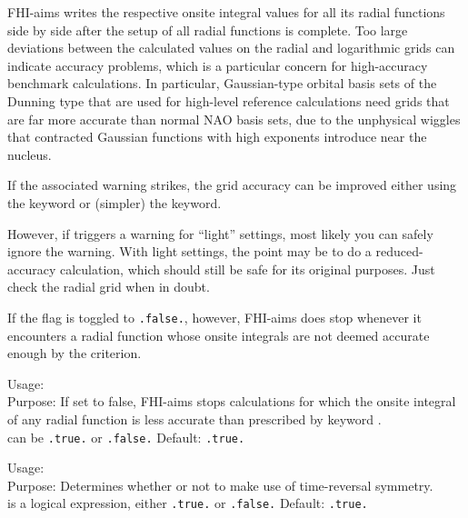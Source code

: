 FHI-aims writes the respective onsite integral values for all its
radial functions side by side after the setup of all radial functions
is complete. Too large deviations between the calculated values on the
radial and logarithmic grids can indicate accuracy problems, which is
a particular concern for high-accuracy benchmark calculations. In
particular, Gaussian-type orbital basis sets of the Dunning type that
are used for high-level reference calculations need grids that are far
more accurate than normal NAO basis sets, due to the unphysical
wiggles that contracted Gaussian functions with high exponents
introduce near the nucleus.

If the associated warning strikes, the grid accuracy can be improved
either using the  keyword or (simpler) the
 keyword.

However, if 
triggers a warning for ``light'' settings, most likely you can safely
ignore the warning. With light settings, the point may be to do a
reduced-accuracy calculation, which should still be safe for its
original purposes. Just check the radial grid when in doubt.

If the flag  is toggled to
\texttt{.false.}, however, FHI-aims does stop whenever it encounters a
radial function whose onsite integrals are not deemed accurate enough
by the  criterion.

{
  \noindent
  Usage:   \\[1.0ex]
  Purpose: If set to false, FHI-aims stops calculations for which the
    onsite integral of any radial function is less accurate than
    prescribed by keyword . \\[1.0ex]
   can be \texttt{.true.} or \texttt{.false.} Default: \texttt{.true.} \\
}

{
  \noindent
  Usage:   \\[1.0ex]
  Purpose: Determines whether or not to make use of time-reversal symmetry.
  \\[1.0ex] 
   is a logical expression, either \texttt{.true.} or
    \texttt{.false.} Default: \texttt{.true.} \\
}

